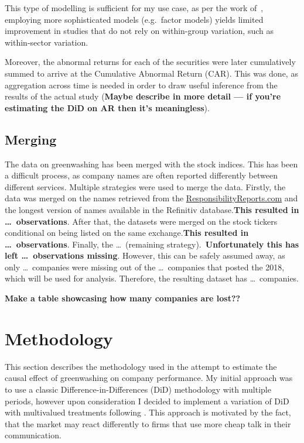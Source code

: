 \documentclass[12pt]{article}
\begin{document}
This type of modelling is sufficient for my use case, as per the work of~\citeauthor{mackinlayEventStudiesEconomics1997}, employing more sophisticated models (e.g.~factor models) yields limited improvement in studies that do not rely on within-group variation, such as within-sector variation.

Moreover, the abnormal returns for each of the securities were later cumulatively summed to arrive at the Cumulative Abnormal Return (CAR). This was done, as aggregation across time is needed in order to draw useful inference from the results of the actual study (\textbf{Maybe describe in more detail --- if you're estimating the DiD on AR then it's meaningless}). 

\subsection{Merging}

The data on greenwashing has been merged with the stock indices. This has been a difficult process, as company names are often reported differently between different services. Multiple strategies were used to merge the data. Firstly, the data was merged on the names retrieved from the \href{https://responsibilityreports.com}{ResponsibilityReports.com} and the longest version of names available in the Refinitiv database.\@ \textbf{This resulted in \dots\ observations}. After that, the datasets were merged on the stock tickers conditional on being listed on the same exchange.\@ \textbf{This resulted in \dots\ observations}. Finally, the \dots\ (remaining strategy).\ \textbf{Unfortunately this has left \dots\ observations missing}. However, this can be safely assumed away, as only \dots\ companies were missing out of the \dots\ companies that posted the 2018, which will be used for analysis. Therefore, the resulting dataset has \dots\ companies. 

\vspace{1cm}
\textbf{Make a table showcasing how many companies are lost??}



\section{Methodology}\label{sect:methodology}

This section describes the methodology used in the attempt to estimate the causal effect of greenwashing on company performance.
My initial approach was to use a classic Difference-in-Differences (DiD) methodology with multiple periods, however upon consideration I decided to implement a variation of DiD with multivalued treatments following \parencite{callawayDifferenceindifferencesContinuousTreatment2024}. This approach is motivated by the fact, that the market may react differently to firms that use more cheap talk in their communication. 
\end{document}
